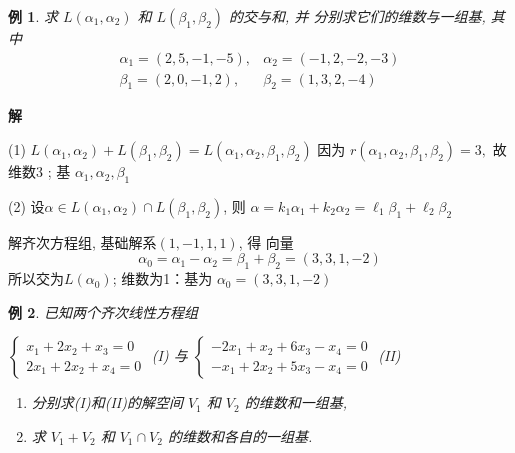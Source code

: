 \documentclass[13pt]{beamer}
\newtheorem{exa}{例}
\def\sol{{\bf 解~~ }}
\begin{document}
\begin{frame}
\begin{exa}
求 $L\left(\alpha_{1}, \alpha_{2}\right)$ 和 $L \left(\beta_{1}, \beta_{2}\right)$ 的交与和, 并 分别求它们的维数与一组基, 其中
\[
\begin{array}{ll}
\alpha_{1}=(2,5,-1,-5), & \alpha_{2}=(-1,2,-2,-3) \\
\beta_{1}=(2,0,-1,2), & \beta_{2}=(1,3,2,-4)
\end{array}
\]
\end{exa}
\pause
\sol

(1) $L\left(\alpha_{1}, \alpha_{2}\right)+L\left(\beta_{1}, \beta_{2}\right)=L\left(\alpha_{1}, \alpha_{2}, \beta_{1}, \beta_{2}\right)$
因为 $r \left(\alpha_{1}, \alpha_{2}, \beta_{1}, \beta_{2}\right)=3,$ 故维数3 ; 
基
$\alpha_{1}, \alpha_{2}, \beta_{1}$

(2) 设$\alpha \in L\left(\alpha_{1}, \alpha_{2}\right) \cap L\left(\beta_{1}, \beta_{2}\right)$, 则 
	$\alpha=k_{1} \alpha_{1}+k_{2} \alpha_{2}=\ell_{1} \beta_{1}+\ell_{2} \beta_{2}$
	
解齐次方程组, 基础解系$(1,-1,1,1)$, 得 向量
\[
\alpha_{0}=\alpha_{1}-\alpha_{2}=\beta_{1}+\beta_{2}=(3,3,1,-2)
\]
所以交为$L \left(\alpha_{0}\right)$; 
维数为1：基为 $\alpha_{0}=(3,3,1,-2)$
\end{frame}

\begin{frame}
\begin{exa}
已知两个齐次线性方程组
\begin{center}
$\left\{\begin{array}{c}x_{1}+2 x_{2}+x_{3}=0 \\ 2 x_{1}+2 x_{2}+x_{4}=0\end{array}\right.$ (I)  
\quad  与  \quad 
 $\left\{\begin{array}{l}-2 x_{1}+x_{2}+6 x_{3}-x_{4}=0 \\ -x_{1}+2 x_{2}+5 x_{3}-x_{4}=0\end{array}\right.$ (II)
\end{center}

\begin{enumerate}
\item 分别求(I)和(II)的解空间 $V_{1}$ 和 $V_{2}$ 的维数和一组基,
\item 求 $V_{1}+V_{2}$ 和 $V_{1} \cap V_{2}$ 的维数和各自的一组基.
\end{enumerate}
\end{exa}

\end{frame}
\end{document}
